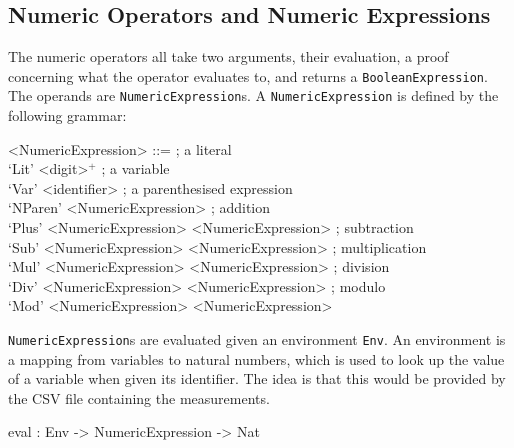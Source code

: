     \subsection{Numeric Operators and Numeric Expressions}
        The numeric operators all take two arguments, their evaluation, a proof concerning what the operator evaluates to, and returns a \texttt{BooleanExpression}.
        The operands are \texttt{NumericExpression}s. A \texttt{NumericExpression} is defined by the following grammar:
        \setlength{\grammarindent}{12em}
        \begin{grammar}
            <NumericExpression>
            ::=  ; a literal\\
                 `Lit' <digit>$^+$
            \alt ; a variable\\
                 `Var' <identifier>
            \alt ; a parenthesised expression\\
                 `NParen' <NumericExpression>
            \alt ; addition\\
                 `Plus' <NumericExpression> <NumericExpression>
            \alt ; subtraction\\
                 `Sub' <NumericExpression> <NumericExpression>
            \alt ; multiplication\\
                 `Mul' <NumericExpression> <NumericExpression>
            \alt ; division\\
                 `Div' <NumericExpression> <NumericExpression>
            \alt ; modulo\\
                 `Mod' <NumericExpression> <NumericExpression>
        \end{grammar}
        \texttt{NumericExpression}s are evaluated given an environment \texttt{Env}. An environment is a mapping from variables to natural numbers, which is used to look up the value of a variable when given its identifier. The idea is that this would be provided by the CSV file containing the measurements.
        
        \newpage
        
        \begin{code}[caption={The type of the \texttt{eval} function}]
            eval : Env -> NumericExpression -> Nat
        \end{code}
    
